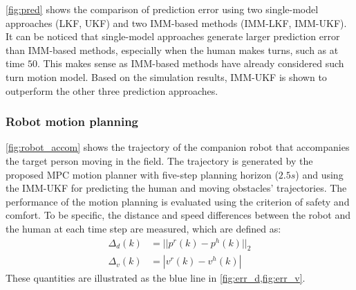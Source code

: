 \documentclass[letterpaper, 10 pt, conference]{ieeeconf}
\begin{document}
	\cref{fig:pred} shows the comparison of prediction error using two single-model approaches (LKF, UKF) and two IMM-based methods (IMM-LKF, IMM-UKF).
	It can be noticed that single-model approaches generate larger prediction error than IMM-based methods, especially when the human makes turns,  such as at time $50$.
	This makes sense as IMM-based methods have already considered such turn motion model.
	Based on the simulation results, IMM-UKF is shown to outperform the other three prediction approaches.
	
	\subsubsection{Robot motion planning}\label{subsubsec:motion_plan}
	\cref{fig:robot_accom} shows the trajectory of the companion robot that accompanies the target person moving in the field. The trajectory is generated by the proposed MPC motion planner with five-step planning horizon ($2.5s$) and using the IMM-UKF for predicting the human and moving obstacles' trajectories.
	The performance of the motion planning is evaluated using the criterion of safety and comfort.
	To be specific, the distance and speed differences between the robot and the human at each time step are measured, which are defined as:
	\begin{subequations}
		\begin{align}
			\Delta_d(k)&=||p^r(k)-p^h(k)||_2\label{eqn:err_d}\\
			\Delta_v(k)&=|v^r(k)-v^h(k)|\label{eqn:err_v}
		\end{align}
	\end{subequations}
	These quantities are illustrated as the blue line in \cref{fig:err_d,fig:err_v}.
	
\end{document}
